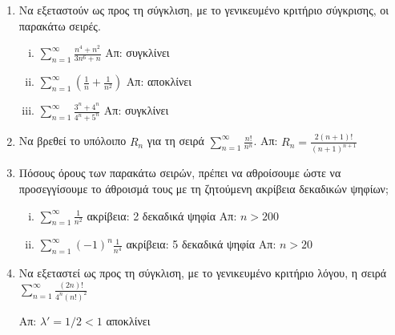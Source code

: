 



\geometry{top=1.6cm}
\everymath{\displaystyle}
\pagestyle{askhseis}




\begin{center}
  \minibox{\large \bfseries \textcolor{Col1}{Ασκήσεις στις Σειρές}}
\end{center}

\vspace{\baselineskip}

\begin{enumerate}
  \item Να εξεταστούν ως προς τη σύγκλιση, με το γενικευμένο κριτήριο σύγκρισης, 
    οι παρακάτω σειρές.
    \begin{enumerate}[i)]
      \item $ \sum_{n=1}^{\infty} \frac{n^{4}+n^{2}}{3n^{6}+n} $ \hfill Απ: συγκλίνει 
      \item $ \sum_{n=1}^{\infty} \left(\frac{1}{n} + \frac{1}{n^{2}}\right) $ 
        \hfill Απ: αποκλίνει 
      \item $ \sum_{n=1}^{\infty} \frac{3^{n}+4^{n}}{4^{n}+5^{n}} $ \hfill Απ: συγκλίνει 
    \end{enumerate}

  \item Να βρεθεί το υπόλοιπο $ R_{n} $ για τη σειρά 
    $ \sum_{n=1}^{\infty} \frac{n!}{n^{n}} $. 
    \hfill Απ: $ R_{n} = \frac{2(n+1)!}{(n+1)^{n+1}} $  

  \item Πόσους όρους των παρακάτω σειρών, πρέπει να αθροίσουμε ώστε να προσεγγίσουμε 
    το άθροισμά τους με τη ζητούμενη ακρίβεια δεκαδικών ψηφίων; 
    \begin{enumerate}[i)]
      \item $ \sum_{n=1}^{\infty} \frac{1}{n^{2}} $ \quad 
        \textcolor{Col1}{ακρίβεια:} 2 δεκαδικά ψηφία \hfill Απ: $ n>200 $  
      \item $ \sum_{n=1}^{\infty} (-1)^{n} \frac{1}{n^{4}} $ \quad
        \textcolor{Col1}{ακρίβεια:} 5 δεκαδικά ψηφία \hfill Απ: $ n>20 $ 
    \end{enumerate}

  \item Να εξεταστεί ως προς τη σύγκλιση, με το γενικευμένο κριτήριο λόγου, η σειρά 
    $ \sum_{n=1}^{\infty} \frac{(2n)!}{4^{n} (n!)^{2}}$ 

    \hfill Απ: $ \lambda ' = 1/2 < 1 $ αποκλίνει

\end{enumerate}
  
